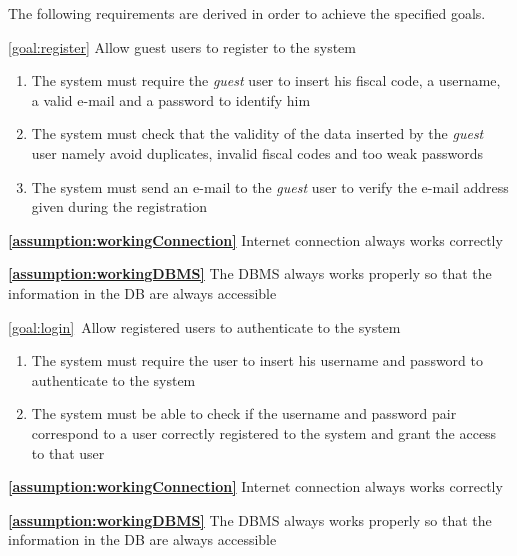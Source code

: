 	The following requirements are derived in order to achieve the specified goals.
	\begin{description}
		\item \ref{goal:register} Allow guest users to register to the system
			\begin{enumerate}[label=\textbf{R\arabic*}]
			
  				\item The system must require the \emph{guest} user to insert his fiscal code, a username, a valid e-mail and a password to identify him
  				
   				\item The system must check that the validity of the data inserted by the \emph{guest} user namely avoid duplicates, invalid fiscal codes and too weak passwords
   				
   				\item The system must send an e-mail to the \emph{guest} user to verify the e-mail address given during the registration
   
  			\end{enumerate}
  				
			\textbf{\ref{assumption:workingConnection}} Internet connection always works correctly
			
			\textbf{\ref{assumption:workingDBMS}} The DBMS always works properly so that the information in the DB are always accessible
  			
		\item \ref{goal:login}\ Allow registered users to authenticate to the system
			\begin{enumerate}[label=\textbf{R\arabic*}, resume]
  				\item The system must require the user to insert his username and password to authenticate to the system
   				\item The system must be able to check if the username and password pair correspond to a user correctly registered to the system and grant the access to that user 
			\end{enumerate}
			
			\textbf{\ref{assumption:workingConnection}} Internet connection always works correctly
			
			\textbf{\ref{assumption:workingDBMS}} The DBMS always works properly so that the information in the DB are always accessible \newline
			

\end{description}
